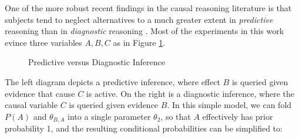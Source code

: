 \documentclass[10pt,letterpaper]{article}
\begin{document}
One of the more robust recent findings in the causal reasoning literature is that subjects tend to neglect alternatives to a much greater extent in \emph{predictive} reasoning than in \emph{diagnostic} reasoning \citep{Fernbach2011,Fernbach2013}. Most of the experiments in this work evince three variables $A,B,C$ as in Figure \ref{diagnostic}.
\begin{figure}[h] \begin{center}
\hspace{.7in}
   \end{center}
 \caption{Predictive versus Diagnostic Inference} \label{diagnostic}
\end{figure}
The left diagram depicts a predictive inference, where effect $B$ is queried given evidence that cause $C$ is active. On the right is a diagnostic inference, where the causal variable $C$ is queried given evidence $B$. In this simple model, we can fold $P(A)$ and $\theta_{B,A}$ into a single parameter $\theta_2$, so that $A$ effectively has prior probability 1, and the resulting conditional probabilities can be simplified to: 
\end{document}
